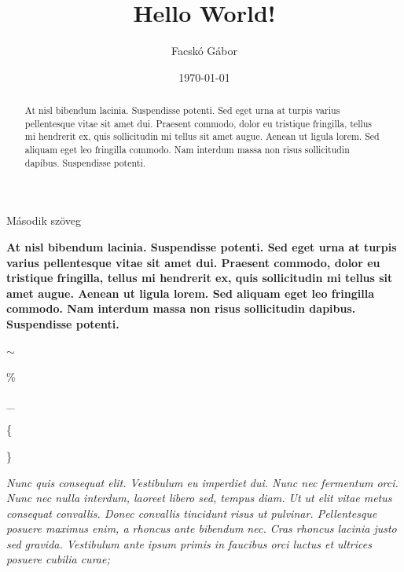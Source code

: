 \documentclass[a4paper,12pt]{article} %
\begin{document}
\author{Facskó Gábor}

\title{Hello World!}

\date{\today}

\maketitle

\begin{abstract}
At nisl bibendum lacinia. Suspendisse potenti. Sed eget urna at turpis varius pellentesque vitae sit amet dui. Praesent commodo, dolor eu tristique fringilla, tellus mi hendrerit ex, quis sollicitudin mi tellus sit amet augue. Aenean ut ligula lorem. Sed aliquam eget leo fringilla commodo. Nam interdum massa non risus sollicitudin dapibus. Suspendisse potenti.
\end{abstract}




Második szöveg

\textbf{At nisl bibendum lacinia. Suspendisse potenti. Sed eget urna at turpis varius pellentesque vitae sit amet dui. Praesent commodo, dolor eu tristique fringilla, tellus mi hendrerit ex, quis sollicitudin mi tellus sit amet augue. Aenean ut ligula lorem. Sed aliquam eget leo fringilla commodo. Nam interdum massa non risus sollicitudin dapibus. Suspendisse potenti.}



$\sim$ %

\%

\_

\{

\}

\textit{Nunc quis consequat elit. Vestibulum eu imperdiet dui. Nunc nec fermentum orci. Nunc nec nulla interdum, laoreet libero sed, tempus diam. Ut ut elit vitae metus consequat convallis. Donec convallis tincidunt risus ut pulvinar. Pellentesque posuere maximus enim, a rhoncus ante bibendum nec. Cras rhoncus lacinia justo sed gravida. Vestibulum ante ipsum primis in faucibus orci luctus et ultrices posuere cubilia curae;}
\end{document}
